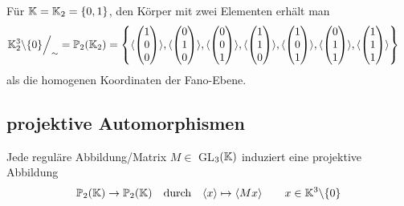   \begin{bsp}
    Für $\mathbb K=\mathbb K_2 = \{0,1\}$, den Körper mit zwei Elementen erhält man
    \begin{align*}
      \mathbb K_2^3 \backslash \{0\} \Big/_\sim = \mathbb{P}_2(\mathbb K_2) 
          & = \left\{ \langle \begin{pmatrix} 1 \\ 0 \\ 0 \end{pmatrix} \rangle, 
                      \langle \begin{pmatrix} 0 \\ 1 \\ 0 \end{pmatrix} \rangle, 
                      \langle \begin{pmatrix} 0 \\ 0 \\ 1 \end{pmatrix} \rangle, 
                      \langle \begin{pmatrix} 1 \\ 1 \\ 0 \end{pmatrix} \rangle, 
                      \langle \begin{pmatrix} 1 \\ 0 \\ 1 \end{pmatrix} \rangle, 
                      \langle \begin{pmatrix} 0 \\ 1 \\ 1 \end{pmatrix} \rangle, 
                      \langle \begin{pmatrix} 1 \\ 1 \\ 1 \end{pmatrix} \rangle 
              \right\}
    \end{align*}
    als die homogenen Koordinaten der Fano-Ebene.
  \end{bsp}

\subsection*{projektive Automorphismen}

  \begin{defi}
    Jede reguläre Abbildung/Matrix $M\in$ GL$_3(\mathbb K)$ induziert eine projektive Abbildung 
    \begin{align*}
      \mathbb{P}_2(\mathbb K) \rightarrow  \mathbb{P}_2(\mathbb K) \quad \mbox{durch} \quad 
      \langle x \rangle \mapsto \langle Mx \rangle \qquad x \in \mathbb K^{3}\backslash\{0\} 
    \end{align*}
  \end{defi}

